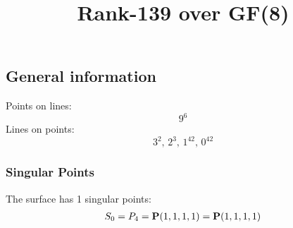 \documentclass{article}
\newcommand\setTBstruts{\def\T{\rule{0pt}{2.6ex}}%
\def\B{\rule[-1.2ex]{0pt}{0pt}}}
\newcommand{\bP}{{\bf P}}
\begin{document}
 
\setTBstruts



{\allowdisplaybreaks%






\title{Rank-139 over GF(8)}
\author{}%
\maketitle%
%
{}



\subsection*{General information}
Points on lines:
$$
9^6$$
Lines on points:
$$
3^2,\,2^3,\,1^{42},\,0^{42}$$
\subsubsection*{Singular Points}
The surface has 1 singular points:\\
\begin{align*}
S_{0} &= P_{4}=\bP(1, 1, 1, 1) = \bP(1, 1, 1, 1)\\
\end{align*}
}
\end{document}

